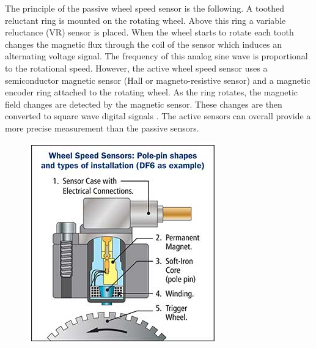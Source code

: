 The principle of the passive wheel speed sensor is the following. A toothed reluctant ring is mounted on the rotating wheel. Above this ring a variable reluctance (VR) sensor is placed. When the wheel starts to rotate each tooth changes the magnetic flux through the coil of the sensor which induces an alternating voltage signal. The frequency of this analog sine wave is proportional to the rotational speed. However, the active wheel speed sensor uses a semiconductor magnetic sensor (Hall or magneto-resistive sensor) and a magnetic encoder ring attached to the rotating wheel. As the ring rotates, the magnetic field changes are detected by the magnetic sensor. These changes are then converted to square wave digital signals \cite{wheel_speed_sensors}. The active sensors can overall provide a more precise measurement than the passive sensors.
\FloatBarrier
\begin{figure}[htbp]
    \centering
    \begin{minipage}{0.45\textwidth}
        \centering
        \includegraphics[width=\linewidth]{images/passive_wheel_speed_sensor.png}
    \end{minipage}
    \hfill
    \begin{minipage}{0.45\textwidth}
        \centering

\end{minipage}
\end{figure}
